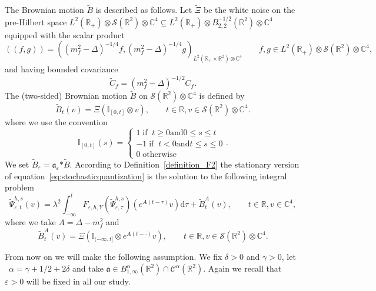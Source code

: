 \documentclass{article}
\newcommand{\asterisk}{\mathord{*}}
\newcommand{\mathd}{\mathrm{d}}
\newcommand{\tmop}[1]{\ensuremath{\operatorname{#1}}}
\begin{document}
The Brownian motion $\tilde{B}$ is described as follows. Let $\tilde{\Xi}$ be
the white noise on the pre-Hilbert space $L^2 (\mathbb{R}_+) \otimes
\mathcal{S} (\mathbb{R}^2) \otimes \mathbb{C}^4 \subseteq L^2 (\mathbb{R}_+)
\otimes B_{2, 2}^{- 1 / 2} (\mathbb{R}^2) \otimes \mathbb{C}^4$ equipped with
the scalar product
\begin{equation}
  ((f, g)) = ((m_f^2 - \Delta)^{- 1 / 4} f, (m_f^2 - \Delta)^{- 1 / 4} g)_{L^2
  (\mathbb{R}_+ \times \mathbb{R}^2) \otimes \mathbb{C}^4}
  \label{eq:scalarproduct} \qquad f, g \in L^2 (\mathbb{R}_+) \otimes
  \mathcal{S} (\mathbb{R}^2) \otimes \mathbb{C}^4,
\end{equation}
and having bounded covariance
\[ \tilde{C}_f = (m^2_f - \Delta)^{- 1 / 2} C_f . \]
The (two-sided) Brownian motion $\tilde{B}$ on $\mathcal{S} (\mathbb{R}^2)
\otimes \mathbb{C}^4$ is defined by
\[ \tilde{B}_t (v) = \Xi (\mathbb{I}_{[0, t]} \otimes v), \qquad t \in
   \mathbb{R}, v \in \mathcal{S} (\mathbb{R}^2) \otimes \mathbb{C}^4 . \]
where we use the convention
\[ \mathbb{I}_{[0, t]} (s) = \left\{\begin{array}{l}
     1 \tmop{if} \; t \geqslant 0 \text{and} 0 \leqslant s \leqslant t\\
     - 1 \tmop{if} \; t < 0 \text{and} t \leqslant s \leqslant 0\\
     0 \tmop{otherwise}
   \end{array}\right. . \]
We set $\tilde{B}_{\varepsilon} = \mathfrak{a}_{\varepsilon} \asterisk
\tilde{B}$. According to Definition~\ref{definition_F2} the stationary version
of equation~{\eqref{eq:stochasticquantization}} is the solution to the
following integral problem
\begin{equation}
  \tilde{\Psi}^{h, s}_{\varepsilon, t} (v) = \lambda^2 \int_{- \infty}^t
  F_{\varepsilon, h, Y} (\tilde{\Psi}_{\varepsilon, \tau}^{h, s}) (e^{A (t -
  \tau)} v) \mathd \tau + \tilde{B}^A_t (v), \label{eq:yukawas} \qquad t \in
  \mathbb{R}, v \in \mathbb{C}^4,
\end{equation}
where we take $A = \Delta - m_f^2$ and
\[ \tilde{B}^A_t (v) = \Xi (\mathbb{I}_{(- \infty, t]} \otimes e^{A (t -
   \cdot)} v), \qquad t \in \mathbb{R}, v \in \mathcal{S} (\mathbb{R}^2)
   \otimes \mathbb{C}^4 . \]
\begin{remark}
  \label{remark_alpha}From now on we will make the following assumption. We
  fix $\delta > 0$ and $\gamma > 0$, let \ $\alpha = \gamma + 1 / 2 + 2
  \delta$ and take $\mathfrak{a} \in B^{\alpha}_{1, \infty} (\mathbb{R}^2)
  \cap \mathcal{C}^{\alpha} (\mathbb{R}^2)$. Again we recall that $\varepsilon
  > 0$ will be fixed in all our study.
\end{remark}
\end{document}
